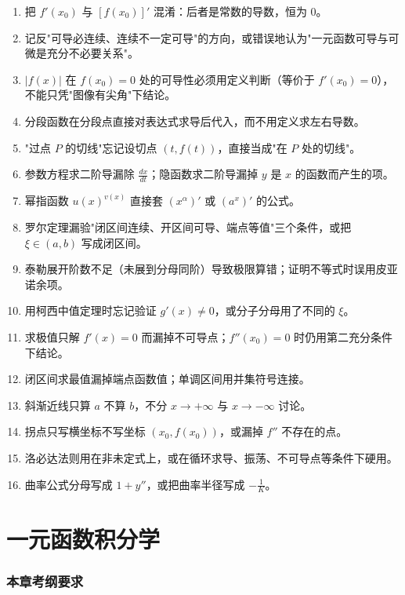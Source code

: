 \documentclass[11pt,openany,UTF8]{ctexbook}
\begin{document}
\begin{enumerate}
\item 把 $f'(x_0)$ 与 $[f(x_0)]'$ 混淆：后者是常数的导数，恒为 $0$。
\item 记反"可导必连续、连续不一定可导"的方向，或错误地认为"一元函数可导与可微是充分不必要关系"。
\item $|f(x)|$ 在 $f(x_0)=0$ 处的可导性必须用定义判断（等价于 $f'(x_0)=0$），不能只凭"图像有尖角"下结论。
\item 分段函数在分段点直接对表达式求导后代入，而不用定义求左右导数。
\item "过点 $P$ 的切线"忘记设切点 $(t,f(t))$，直接当成"在 $P$ 处的切线"。
\item 参数方程求二阶导漏除 $\frac{dx}{dt}$；隐函数求二阶导漏掉 $y$ 是 $x$ 的函数而产生的项。
\item 幂指函数 $u(x)^{v(x)}$ 直接套 $(x^\alpha)'$ 或 $(a^x)'$ 的公式。
\item 罗尔定理漏验"闭区间连续、开区间可导、端点等值"三个条件，或把 $\xi\in(a,b)$ 写成闭区间。
\item 泰勒展开阶数不足（未展到分母同阶）导致极限算错；证明不等式时误用皮亚诺余项。
\item 用柯西中值定理时忘记验证 $g'(x)\ne0$，或分子分母用了不同的 $\xi$。
\item 求极值只解 $f'(x)=0$ 而漏掉不可导点；$f''(x_0)=0$ 时仍用第二充分条件下结论。
\item 闭区间求最值漏掉端点函数值；单调区间用并集符号连接。
\item 斜渐近线只算 $a$ 不算 $b$，不分 $x\to+\infty$ 与 $x\to-\infty$ 讨论。
\item 拐点只写横坐标不写坐标 $(x_0,f(x_0))$，或漏掉 $f''$ 不存在的点。
\item 洛必达法则用在非未定式上，或在循环求导、振荡、不可导点等条件下硬用。
\item 曲率公式分母写成 $1+y''$，或把曲率半径写成 $-\frac1K$。
\end{enumerate}
\chapter{一元函数积分学}
\subsection*{本章考纲要求}
\end{document}
